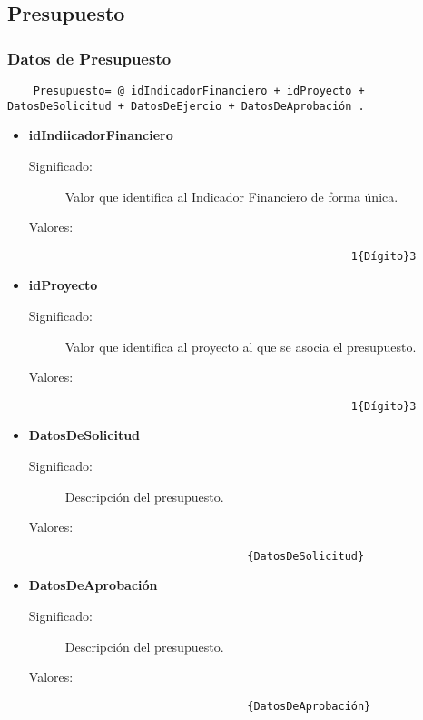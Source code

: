 \subsection{Presupuesto}
\label{dd:Presupuestos}
\subsubsection{Datos de Presupuesto}
\begin{lstlisting}
	Presupuesto= @ idIndicadorFinanciero + idProyecto + DatosDeSolicitud + DatosDeEjercio + DatosDeAprobación .

\end{lstlisting}
\begin{itemize}
	\item	\textbf{idIndiicadorFinanciero}
		\begin{description}
			\item [Significado:] Valor que identifica al Indicador Financiero de forma única.
			\item [Valores:]{\begin{lstlisting}
                                            1{Dígito}3
                                         \end{lstlisting}}
		\end{description}
	
	\item	\textbf{idProyecto}
		\begin{description}
			\item [Significado:] Valor que identifica al proyecto al que se asocia el presupuesto.
			\item [Valores:]{\begin{lstlisting}
                                            1{Dígito}3
                                         \end{lstlisting}}
		\end{description}
	
	
	\item	\textbf{DatosDeSolicitud}
		\begin{description}
		 \item [Significado:] Descripción del presupuesto.
		\item [Valores:] {\begin{lstlisting}
		                    {DatosDeSolicitud}
		                  \end{lstlisting}
				}
		\end{description}
	\item	\textbf{DatosDeAprobación}
		\begin{description}
		 \item [Significado:] Descripción del presupuesto.
		\item [Valores:] {\begin{lstlisting}
		                    {DatosDeAprobación}
		                  \end{lstlisting}
				}
		\end{description}


        
\end{itemize}




